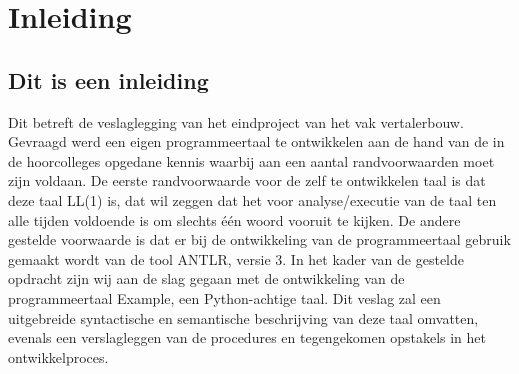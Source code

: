 \chapter{Inleiding}
\section{Dit is een inleiding}
Dit betreft de veslaglegging van het eindproject van het vak vertalerbouw. Gevraagd werd een eigen programmeertaal te ontwikkelen aan de hand van de in de hoorcolleges opgedane kennis waarbij aan een aantal randvoorwaarden moet zijn voldaan. De eerste randvoorwaarde voor de zelf te ontwikkelen taal is dat deze taal LL(1) is, dat wil zeggen dat het voor analyse/executie van de taal ten alle tijden voldoende is om slechts \'{e}\'{e}n woord vooruit te kijken. De andere gestelde voorwaarde is dat er bij de ontwikkeling van de programmeertaal gebruik gemaakt wordt van de tool ANTLR, versie 3. In het kader van de gestelde opdracht zijn wij aan de slag gegaan met de ontwikkeling van de programmeertaal Example, een Python-achtige taal. Dit veslag zal een uitgebreide syntactische en semantische beschrijving van deze taal omvatten, evenals een verslagleggen van de procedures en tegengekomen opstakels in het ontwikkelproces.

